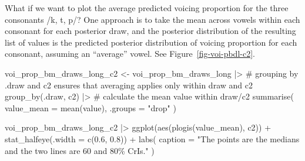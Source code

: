 \documentclass[
  authoryear,
  preprint,
  3p]{elsarticle}
\newenvironment{Shaded}{\begin{snugshade}}{\end{snugshade}}
\newcommand{\AttributeTok}[1]{\textcolor[rgb]{0.40,0.45,0.13}{#1}}
\newcommand{\CommentTok}[1]{\textcolor[rgb]{0.37,0.37,0.37}{#1}}
\newcommand{\FloatTok}[1]{\textcolor[rgb]{0.68,0.00,0.00}{#1}}
\newcommand{\FunctionTok}[1]{\textcolor[rgb]{0.28,0.35,0.67}{#1}}
\newcommand{\NormalTok}[1]{\textcolor[rgb]{0.00,0.23,0.31}{#1}}
\newcommand{\OtherTok}[1]{\textcolor[rgb]{0.00,0.23,0.31}{#1}}
\newcommand{\SpecialCharTok}[1]{\textcolor[rgb]{0.37,0.37,0.37}{#1}}
\newcommand{\StringTok}[1]{\textcolor[rgb]{0.13,0.47,0.30}{#1}}
\begin{document}
What if we want to plot the average predicted voicing proportion for the
three consonants /k, t, p/? One approach is to take the mean across
vowels within each consonant for each posterior draw, and the posterior
distribution of the resulting list of values is the predicted posterior
distribution of voicing proportion for each consonant, assuming an
``average'' vowel. See Figure~\ref{fig-voi-pbdl-c2}.

\begin{Shaded}
\begin{Highlighting}[]
\NormalTok{voi\_prop\_bm\_draws\_long\_c2 }\OtherTok{\textless{}{-}}\NormalTok{ voi\_prop\_bm\_draws\_long }\SpecialCharTok{|\textgreater{}} 
  \CommentTok{\# grouping by .draw and c2 ensures that averaging applies only within draw and c2}
  \FunctionTok{group\_by}\NormalTok{(.draw, c2) }\SpecialCharTok{|\textgreater{}} 
  \CommentTok{\# calculate the mean value within draw/c2}
  \FunctionTok{summarise}\NormalTok{(}
    \AttributeTok{value\_mean =} \FunctionTok{mean}\NormalTok{(value), }\AttributeTok{.groups =} \StringTok{"drop"}
\NormalTok{  )}
\end{Highlighting}
\end{Shaded}

\begin{Shaded}
\begin{Highlighting}[]
\NormalTok{voi\_prop\_bm\_draws\_long\_c2 }\SpecialCharTok{|\textgreater{}} 
  \FunctionTok{ggplot}\NormalTok{(}\FunctionTok{aes}\NormalTok{(}\FunctionTok{plogis}\NormalTok{(value\_mean), c2)) }\SpecialCharTok{+}
  \FunctionTok{stat\_halfeye}\NormalTok{(}\AttributeTok{.width =} \FunctionTok{c}\NormalTok{(}\FloatTok{0.6}\NormalTok{, }\FloatTok{0.8}\NormalTok{)) }\SpecialCharTok{+}
  \FunctionTok{labs}\NormalTok{(}
    \AttributeTok{caption =} \StringTok{"The points are the medians and the two lines are 60 and 80\% CrIs."}
\NormalTok{  )}
\end{Highlighting}
\end{Shaded}
\end{document}
